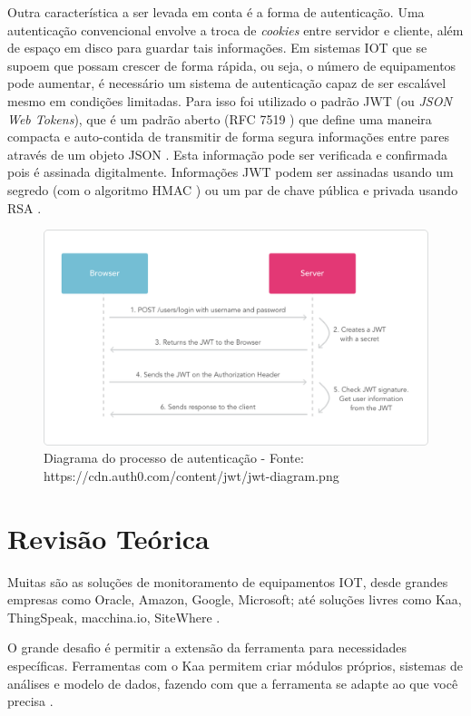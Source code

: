 Outra característica a ser levada em conta é a forma de autenticação.
Uma autenticação convencional envolve a troca de \emph{cookies} entre
servidor e cliente, além de espaço em disco para guardar tais
informações. Em sistemas IOT que se supoem que possam crescer de forma
rápida, ou seja, o número de equipamentos pode aumentar, é necessário um
sistema de autenticação capaz de ser escalável mesmo em condições
limitadas. Para isso foi utilizado o padrão JWT (ou \emph{JSON Web
Tokens}), que é um padrão aberto (RFC 7519 \cite{rfc7519-2015}) que
define uma maneira compacta e auto-contida de transmitir de forma segura
informações entre pares através de um objeto JSON \cite{jwt-2016}. Esta
informação pode ser verificada e confirmada pois é assinada
digitalmente. Informações JWT podem ser assinadas usando um segredo (com
o algoritmo HMAC \cite{rfc2104-1997}) ou um par de chave pública e
privada usando RSA \cite{rfc3447-2003}.

\begin{figure}[h]
    \includegraphics[scale=0.3]{img/jwt-diagram.png}
    \caption{Diagrama do processo de autenticação - Fonte: https://cdn.auth0.com/content/jwt/jwt-diagram.png}
\end{figure}

\section{Revisão Teórica}\label{revisuxe3o-teuxf3rica}

Muitas são as soluções de monitoramento de equipamentos IOT, desde
grandes empresas como Oracle, Amazon, Google, Microsoft; até soluções
livres como Kaa, ThingSpeak, macchina.io, SiteWhere
\cite{postscapes-iot-2016}.

O grande desafio é permitir a extensão da ferramenta para necessidades
específicas. Ferramentas com o Kaa permitem criar módulos próprios,
sistemas de análises e modelo de dados, fazendo com que a ferramenta se
adapte ao que você precisa \cite{kaa-2014}.


